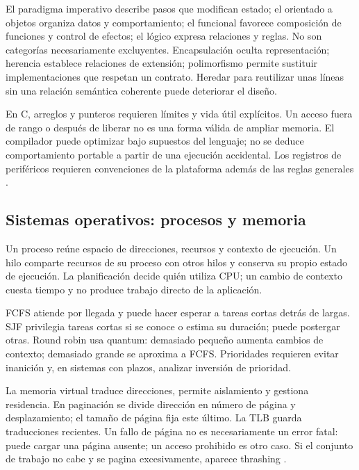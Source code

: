 El paradigma imperativo describe pasos que modifican estado; el orientado a objetos organiza datos y comportamiento; el funcional favorece composición de funciones y control de efectos; el lógico expresa relaciones y reglas. No son categorías necesariamente excluyentes. Encapsulación oculta representación; herencia establece relaciones de extensión; polimorfismo permite sustituir implementaciones que respetan un contrato. Heredar para reutilizar unas líneas sin una relación semántica coherente puede deteriorar el diseño.

En C, arreglos y punteros requieren límites y vida útil explícitos. Un acceso fuera de rango o después de liberar no es una forma válida de ampliar memoria. El compilador puede optimizar bajo supuestos del lenguaje; no se deduce comportamiento portable a partir de una ejecución accidental. Los registros de periféricos requieren convenciones de la plataforma además de las reglas generales \cite[secciones Types, Expressions, Statements y Memory model]{cppreference}.

\subsection{Sistemas operativos: procesos y memoria}
Un proceso reúne espacio de direcciones, recursos y contexto de ejecución. Un hilo comparte recursos de su proceso con otros hilos y conserva su propio estado de ejecución. La planificación decide quién utiliza CPU; un cambio de contexto cuesta tiempo y no produce trabajo directo de la aplicación.

FCFS atiende por llegada y puede hacer esperar a tareas cortas detrás de largas. SJF privilegia tareas cortas si se conoce o estima su duración; puede postergar otras. Round robin usa quantum: demasiado pequeño aumenta cambios de contexto; demasiado grande se aproxima a FCFS. Prioridades requieren evitar inanición y, en sistemas con plazos, analizar inversión de prioridad.

La memoria virtual traduce direcciones, permite aislamiento y gestiona residencia. En paginación se divide dirección en número de página y desplazamiento; el tamaño de página fija este último. La TLB guarda traducciones recientes. Un fallo de página no es necesariamente un error fatal: puede cargar una página ausente; un acceso prohibido es otro caso. Si el conjunto de trabajo no cabe y se pagina excesivamente, aparece thrashing \cite[capítulos CPU Scheduling, Address Translation, Paging y Swapping]{ostep}.

